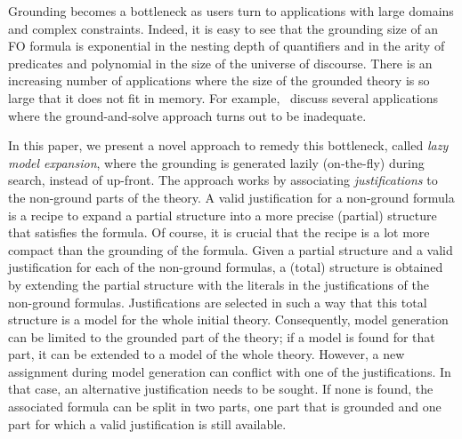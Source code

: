 \documentclass[11pt]{article}
\theoremstyle{plain}
\theoremstyle{definition}
\theoremstyle{example_basic}
\theoremstyle{example_contd}
\theoremstyle{plain}
\newcommand{\change}[1]{#1}
\begin{document}
Grounding becomes a bottleneck as users turn to applications with large domains and complex constraints. Indeed, it is easy to see that the grounding size of an FO formula is exponential in the nesting depth of quantifiers and in the arity of predicates and polynomial in the size of the universe of discourse. There is an increasing number of applications where the size of the grounded theory is so large that it does not fit in memory. \change{For example,~ discuss several \ASP applications where the ground-and-solve approach turns out to be inadequate.}

In this paper, we present a novel approach to remedy this bottleneck, called \emph{lazy model expansion}, where the grounding is generated lazily (on-the-fly) during search, instead of up-front.
The approach works by associating {\em justifications} to the non-ground parts of the theory. A valid justification for a non-ground formula is a recipe to
expand a partial structure into a more precise (partial) structure that satisfies the
formula. 
\change{Of course, it is crucial that the recipe is a lot more compact
  than the grounding of the formula.}
Given a partial structure and a valid justification for each of
the non-ground formulas, a (total) structure 
\change{is obtained by extending the partial structure with the
  literals in the justifications of the non-ground
  formulas. Justifications are selected in such a way that this total
  structure is a model for the whole initial theory.}
Consequently, model generation can be limited to the grounded part of
the theory; if a model is found for that part, it can be extended to a
model of the whole theory. However, a new assignment during model generation can conflict with one of the justifications. In that case, an alternative justification
needs to be sought. If none is found, the associated formula can 
be split in two parts, one part that is grounded and one part for which a
valid justification is still available.
\end{document}
